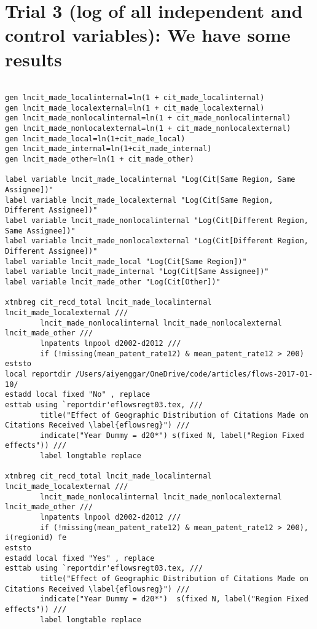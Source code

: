 \documentclass[12pt]{article}
\begin{document}
\section{Trial 3 (log of all independent and control variables): We have some results}
\begin{lstlisting}

gen lncit_made_localinternal=ln(1 + cit_made_localinternal)
gen lncit_made_localexternal=ln(1 + cit_made_localexternal)
gen lncit_made_nonlocalinternal=ln(1 + cit_made_nonlocalinternal)
gen lncit_made_nonlocalexternal=ln(1 + cit_made_nonlocalexternal)
gen lncit_made_local=ln(1+cit_made_local)
gen lncit_made_internal=ln(1+cit_made_internal)
gen lncit_made_other=ln(1 + cit_made_other)

label variable lncit_made_localinternal "Log(Cit[Same Region, Same Assignee])"
label variable lncit_made_localexternal "Log(Cit[Same Region, Different Assignee])"
label variable lncit_made_nonlocalinternal "Log(Cit[Different Region, Same Assignee])"
label variable lncit_made_nonlocalexternal "Log(Cit[Different Region, Different Assignee])"
label variable lncit_made_local "Log(Cit[Same Region])"
label variable lncit_made_internal "Log(Cit[Same Assignee])"
label variable lncit_made_other "Log(Cit[Other])"

xtnbreg cit_recd_total lncit_made_localinternal lncit_made_localexternal ///
		lncit_made_nonlocalinternal lncit_made_nonlocalexternal  lncit_made_other ///
		lnpatents lnpool d2002-d2012 ///
		if (!missing(mean_patent_rate12) & mean_patent_rate12 > 200)
eststo
local reportdir /Users/aiyenggar/OneDrive/code/articles/flows-2017-01-10/
estadd local fixed "No" , replace
esttab using `reportdir'eflowsregt03.tex, ///
		title("Effect of Geographic Distribution of Citations Made on Citations Received \label{eflowsreg}") ///
		indicate("Year Dummy = d20*") s(fixed N, label("Region Fixed effects")) ///
		label longtable replace
		
xtnbreg cit_recd_total lncit_made_localinternal lncit_made_localexternal ///
		lncit_made_nonlocalinternal lncit_made_nonlocalexternal  lncit_made_other ///
		lnpatents lnpool d2002-d2012 ///
		if (!missing(mean_patent_rate12) & mean_patent_rate12 > 200), i(regionid) fe 
eststo
estadd local fixed "Yes" , replace
esttab using `reportdir'eflowsregt03.tex, ///
		title("Effect of Geographic Distribution of Citations Made on Citations Received \label{eflowsreg}") ///
		indicate("Year Dummy = d20*")  s(fixed N, label("Region Fixed effects")) ///
		label longtable replace	

\end{lstlisting}




 

\end{document}
